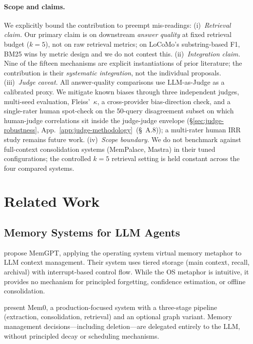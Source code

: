 \documentclass{article}
\begin{document}
\paragraph{Scope and claims.}
We explicitly bound the contribution to preempt mis-readings:
(i)~\emph{Retrieval claim.} Our primary claim is on downstream
\emph{answer quality} at fixed retrieval budget ($k{=}5$), not on
raw retrieval metrics; on LoCoMo's substring-based F1, BM25 wins by
metric design and we do not contest this.
(ii)~\emph{Integration claim.} Nine of the fifteen mechanisms are
explicit instantiations of prior literature; the contribution is their
\emph{systematic integration}, not the individual proposals.
(iii)~\emph{Judge caveat.} All answer-quality comparisons use
LLM-as-Judge as a calibrated proxy. We mitigate known biases through
three independent judges, multi-seed evaluation, Fleiss'~$\kappa$,
a cross-provider bias-direction check, and a single-rater human
spot-check on the 50-query disagreement subset on which human-judge
correlations sit inside the judge-judge envelope
(\S\ref{sec:judge-robustness}, App.~\ref{app:judge-methodology}~(\S~A.8));
a multi-rater human IRR study remains future work.
(iv)~\emph{Scope boundary.} We do not benchmark against full-context
consolidation systems (MemPalace, Mastra) in their tuned configurations;
the controlled $k{=}5$ retrieval setting is held constant across the
four compared systems.

\section{Related Work}
\label{sec:related}

\subsection{Memory Systems for LLM Agents}

\citet{packer2023memgpt} propose MemGPT, applying the operating system
virtual memory metaphor to LLM context management.
Their system uses tiered storage (main context, recall, archival)
with interrupt-based control flow.
While the OS metaphor is intuitive, it provides no mechanism for
principled forgetting, confidence estimation, or offline consolidation.

\citet{chhikara2025mem0} present Mem0, a production-focused system with
a three-stage pipeline (extraction, consolidation, retrieval) and an
optional graph variant.
Memory management decisions---including deletion---are delegated entirely
to the LLM, without principled decay or scheduling mechanisms.
\end{document}
